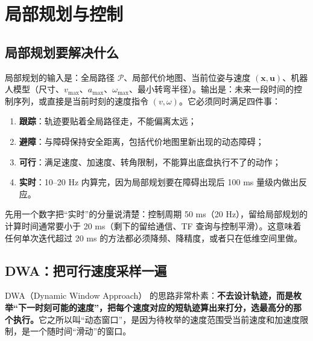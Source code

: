 \chapter{局部规划与控制}\label{ch:20-local-planning}

\usetikzlibrary{arrows.meta,positioning,calc,fit,patterns,decorations.pathreplacing}


\section{局部规划要解决什么}\label{sec:20-what}

局部规划的输入是：全局路径 $\mathcal{P}$、局部代价地图、当前位姿与速度 $(\bm{x},\bm{u})$、机器人模型（尺寸、$v_{\max}$、$a_{\max}$、$\omega_{\max}$、最小转弯半径）。输出是：未来一段时间的控制序列，或直接是当前时刻的速度指令 $(v,\omega)$。它必须同时满足四件事：

\begin{enumerate}
  \item \textbf{跟踪}：轨迹要贴着全局路径走，不能偏离太远；
  \item \textbf{避障}：与障碍保持安全距离，包括代价地图里新出现的动态障碍；
  \item \textbf{可行}：满足速度、加速度、转角限制，不能算出底盘执行不了的动作；
  \item \textbf{实时}：10--20 Hz 内算完，因为局部规划要在障碍出现后 100 ms 量级内做出反应。
\end{enumerate}

先用一个数字把“实时”的分量说清楚：控制周期 50 ms（20 Hz），留给局部规划的计算时间通常要小于 20 ms（剩下的留给通信、TF 查询与控制平滑）。这意味着任何单次迭代超过 20 ms 的方法都必须降频、降精度，或者只在低维空间里做。

\section{DWA：把可行速度采样一遍}\label{sec:20-dwa}

DWA（Dynamic Window Approach）\cite{fox1997dwa} 的思路非常朴素：\textbf{不去设计轨迹，而是枚举“下一时刻可能的速度”，把每个速度对应的短轨迹算出来打分，选最高分的那个执行。}它之所以叫“动态窗口”，是因为待枚举的速度范围受当前速度和加速度限制，是一个随时间“滑动”的窗口。

